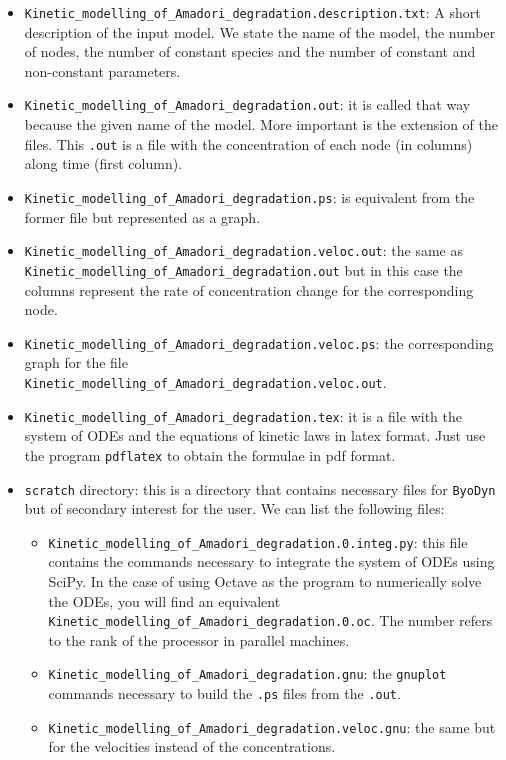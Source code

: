 \documentclass[a4paper, 11pt]{article}
\begin{document}
  \begin{itemize}
    \item
      \texttt{Kinetic\_modelling\_of\_Amadori\_degradation.description.txt}: A short description of the input model. 
      We state the name of the model, the number of nodes, the number of constant species and the number of constant and non-constant parameters.
    \item
      \texttt{Kinetic\_modelling\_of\_Amadori\_degradation.out}: it is called that way because the given name of the model.
      More important is the extension of the files. 
      This \texttt{.out} is a file with the concentration of each node (in columns) along time (first column).
    \item
      \texttt{Kinetic\_modelling\_of\_Amadori\_degradation.ps}: is equivalent from the former file but represented as a graph.
    \item
      \texttt{Kinetic\_modelling\_of\_Amadori\_degradation.veloc.out}: the same as \texttt{Kinetic\_modelling\_of\_Amadori\_degradation.out} but in this case the columns represent the rate of concentration change for the corresponding node.
    \item
      \texttt{Kinetic\_modelling\_of\_Amadori\_degradation.veloc.ps}: the corresponding graph for the file \\\texttt{Kinetic\_modelling\_of\_Amadori\_degradation.veloc.out}.
    \item
      \texttt{Kinetic\_modelling\_of\_Amadori\_degradation.tex}: it is a file with the system of ODEs and the equations of kinetic laws  in latex format. 
      Just use the program \texttt{pdflatex} to obtain the formulae in pdf format.
    \item
      \texttt{scratch} directory: this is a directory that contains necessary files for \texttt{ByoDyn} but of secondary interest for the user.
      We can list the following files:
      \begin{itemize}
	\item
	  \texttt{Kinetic\_modelling\_of\_Amadori\_degradation.0.integ.py}: this file contains the commands necessary to integrate the system of ODEs using SciPy.
          In the case of using Octave as the program to numerically solve the ODEs, you will find an equivalent \texttt{Kinetic\_modelling\_of\_Amadori\_degradation.0.oc}.
          The number refers to the rank of the processor in parallel machines.
	\item
	  \texttt{Kinetic\_modelling\_of\_Amadori\_degradation.gnu}: the \texttt{gnuplot} commands necessary to build the \texttt{.ps} files from the \texttt{.out}.
	\item
	  \texttt{Kinetic\_modelling\_of\_Amadori\_degradation.veloc.gnu}: the same but for the velocities instead of the concentrations.
      \end{itemize}
  \end{itemize}
\end{document}
